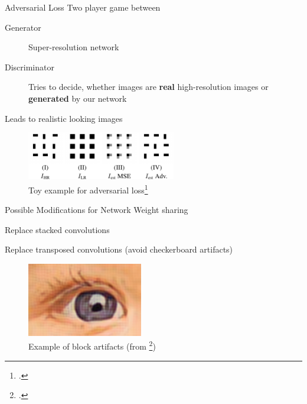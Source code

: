 \documentclass{beamer}
\begin{document}
\begin{frame}{Adversarial Loss}
  Two player game between
  \begin{description}
  \item[Generator] Super-resolution network
  \item[Discriminator] Tries to decide, whether images are \textbf{real} high-resolution images or \textbf{generated} by our network
  \end{description}

  Leads to realistic looking images
\begin{figure}[h]
    \centering
    \includegraphics[width=0.58\textwidth]{adversarial_loss}
    \caption*{Toy example for adversarial loss\footcite{EnhanceNet}}
  \end{figure}
\end{frame}

\begin{frame}{Possible Modifications for Network}
  Weight sharing %

  Replace stacked convolutions

  Replace transposed convolutions (avoid checkerboard artifacts)

  \begin{figure}[h]
    \centering
    \includegraphics[width=0.45\textwidth]{perceptual_loss_vgg}
    \caption*{Example of block artifacts (from \footcite{PerceptualLoss})}
  \end{figure}
\end{frame}
\end{document}
